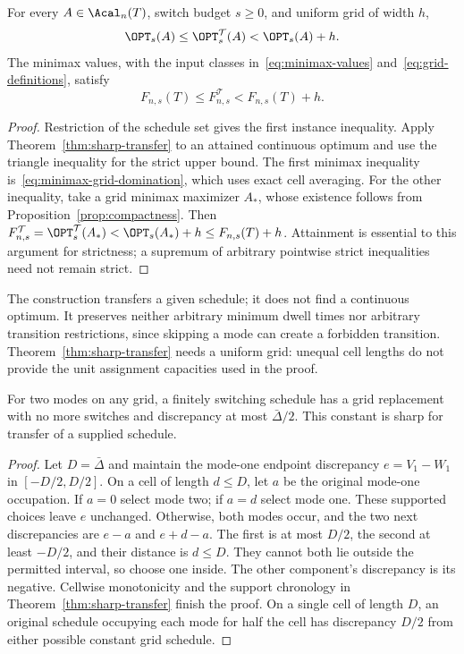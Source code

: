\begin{corollary}\label{cor:opt-transfer}
For every $A\in\Acal_n(T)$, switch budget $s\ge0$, and uniform grid of
width $h$,
\begin{equation}\label{eq:instance-transfer}
 \OPT_s(A)\le\OPT_s^{\mathcal T}(A)<\OPT_s(A)+h.
\end{equation}
The minimax values, with the input classes in~\eqref{eq:minimax-values}
and~\eqref{eq:grid-definitions}, satisfy
\begin{equation}\label{eq:minimax-transfer}
 F_{n,s}(T)\le F_{n,s}^{\mathcal T}<F_{n,s}(T)+h.
\end{equation}
\end{corollary}
\begin{proof}
Restriction of the schedule set gives the first instance inequality. Apply
Theorem~\ref{thm:sharp-transfer} to an attained continuous optimum and use
the triangle inequality for the strict upper bound. The first minimax
inequality is~\eqref{eq:minimax-grid-domination}, which uses exact cell
averaging. For the other inequality, take a grid minimax maximizer $A_*$,
whose existence follows from Proposition~\ref{prop:compactness}. Then
$F_{n,s}^{\mathcal T}=\OPT_s^{\mathcal T}(A_*)<\OPT_s(A_*)+h
\le F_{n,s}(T)+h$. Attainment is essential to this argument for strictness;
a supremum of arbitrary pointwise strict inequalities need not remain strict.
\end{proof}

The construction transfers a given schedule; it does not find a continuous
optimum. It preserves neither arbitrary minimum dwell times nor arbitrary
transition restrictions, since skipping a mode can create a forbidden
transition. Theorem~\ref{thm:sharp-transfer} needs a uniform grid: unequal cell
lengths do not provide the unit assignment capacities used in the proof.

\begin{proposition}\label{prop:binary-transfer}
For two modes on any grid, a finitely switching schedule has a grid
replacement with no more switches and discrepancy at most
$\bar\Delta/2$. This constant is sharp for transfer of a supplied schedule.
\end{proposition}
\begin{proof}
Let $D=\bar\Delta$ and maintain the mode-one endpoint discrepancy
$e=V_1-W_1$ in $[-D/2,D/2]$. On a cell of length $d\le D$, let $a$ be
the original mode-one occupation. If $a=0$ select mode two; if $a=d$
select mode one. These supported choices leave $e$ unchanged. Otherwise,
both modes occur, and the two next discrepancies are $e-a$ and $e+d-a$.
The first is at most $D/2$, the second at least $-D/2$, and their distance
is $d\le D$. They cannot both lie outside the permitted interval, so choose
one inside. The other component's discrepancy is its negative. Cellwise
monotonicity and the support chronology in
Theorem~\ref{thm:sharp-transfer} finish the proof. On a single cell of length
$D$, an original schedule occupying each mode for half the cell has
discrepancy $D/2$ from either possible constant grid schedule.
\end{proof}

